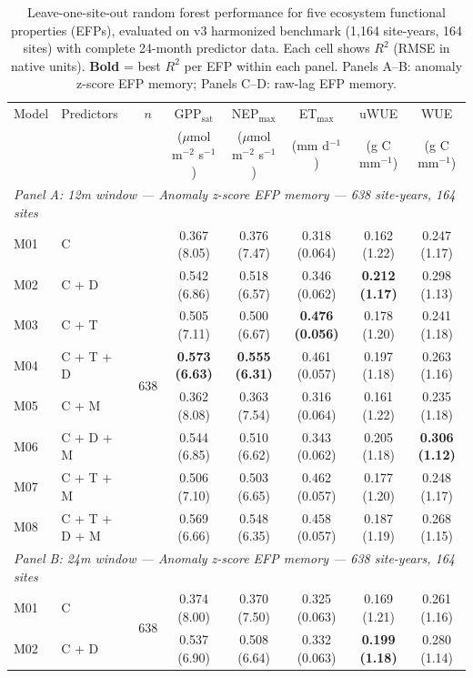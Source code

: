 \begin{table}[htbp]
\centering
\caption{Leave-one-site-out random forest performance for five ecosystem
functional properties (EFPs), evaluated on v3 harmonized benchmark (1,164 site-years,
164 sites) with complete 24-month predictor data. Each cell shows $R^2$ (RMSE in
native units). \textbf{Bold} = best $R^2$ per EFP within each panel.
Panels A--B: anomaly z-score EFP memory; Panels C--D: raw-lag EFP memory.}
\label{tab:RF_LOSO_v3}
\footnotesize
\begin{tabular}{llcccccc}
\toprule
Model & Predictors & $n$ & GPP$_\mathrm{sat}$ & NEP$_\mathrm{max}$ & ET$_\mathrm{max}$ & uWUE & WUE \\
  &  &  & ($\mu$mol m$^{-2}$ s$^{-1}$) & ($\mu$mol m$^{-2}$ s$^{-1}$) & (mm d$^{-1}$) & (g C mm$^{-1}$) & (g C mm$^{-1}$) \\
\midrule
\multicolumn{8}{l}{\textit{Panel A: 12m window --- Anomaly z-score EFP memory --- 638 site-years, 164 sites}} \\
\midrule
M01 & C & \multirow{8}{*}{638} & 0.367 (8.05) & 0.376 (7.47) & 0.318 (0.064) & 0.162 (1.22) & 0.247 (1.17) \\
M02 & C + D &  & 0.542 (6.86) & 0.518 (6.57) & 0.346 (0.062) & \textbf{0.212 (1.17)} & 0.298 (1.13) \\
M03 & C + T &  & 0.505 (7.11) & 0.500 (6.67) & \textbf{0.476 (0.056)} & 0.178 (1.20) & 0.241 (1.18) \\
M04 & C + T + D &  & \textbf{0.573 (6.63)} & \textbf{0.555 (6.31)} & 0.461 (0.057) & 0.197 (1.18) & 0.263 (1.16) \\
M05 & C + M &  & 0.362 (8.08) & 0.363 (7.54) & 0.316 (0.064) & 0.161 (1.22) & 0.235 (1.18) \\
M06 & C + D + M &  & 0.544 (6.85) & 0.510 (6.62) & 0.343 (0.062) & 0.205 (1.18) & \textbf{0.306 (1.12)} \\
M07 & C + T + M &  & 0.506 (7.10) & 0.503 (6.65) & 0.462 (0.057) & 0.177 (1.20) & 0.248 (1.17) \\
M08 & C + T + D + M &  & 0.569 (6.66) & 0.548 (6.35) & 0.458 (0.057) & 0.187 (1.19) & 0.268 (1.15) \\
\midrule
\multicolumn{8}{l}{\textit{Panel B: 24m window --- Anomaly z-score EFP memory --- 638 site-years, 164 sites}} \\
\midrule
M01 & C & \multirow{8}{*}{638} & 0.374 (8.00) & 0.370 (7.50) & 0.325 (0.063) & 0.169 (1.21) & 0.261 (1.16) \\
M02 & C + D &  & 0.537 (6.90) & 0.508 (6.64) & 0.332 (0.063) & \textbf{0.199 (1.18)} & 0.280 (1.14) \\

\end{tabular}
\end{table}
